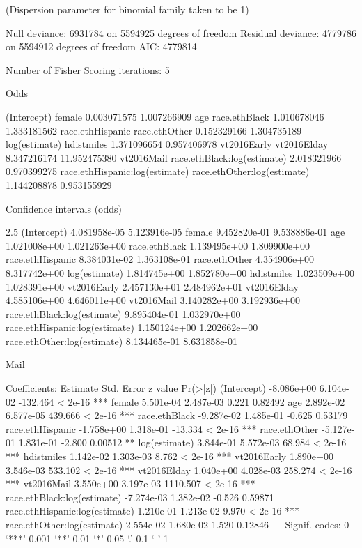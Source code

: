 (Dispersion parameter for binomial family taken to be 1)

    Null deviance: 6931784  on 5594925  degrees of freedom
Residual deviance: 4779786  on 5594912  degrees of freedom
AIC: 4779814

Number of Fisher Scoring iterations: 5

Odds

(Intercept)                         female
0.003071575                    1.007266909
        age                  race.ethBlack
1.010678046                    1.333181562
race.ethHispanic                  race.ethOther
0.152329166                    1.304735189
log(estimate)                     hdistmiles
1.371096654                    0.957406978
vt2016Early                    vt2016Elday
8.347216174                   11.952475380
 vt2016Mail    race.ethBlack:log(estimate)
2.018321966                    0.970399275
race.ethHispanic:log(estimate)    race.ethOther:log(estimate)
1.144208878                    0.953155929


Confidence intervals (odds)

2.5 %
(Intercept)                    4.081958e-05 5.123916e-05
female                         9.452820e-01 9.538886e-01
age                            1.021008e+00 1.021263e+00
race.ethBlack                  1.139495e+00 1.809900e+00
race.ethHispanic               8.384031e-02 1.363108e-01
race.ethOther                  4.354906e+00 8.317742e+00
log(estimate)                  1.814745e+00 1.852780e+00
hdistmiles                     1.023509e+00 1.028391e+00
vt2016Early                    2.457130e+01 2.484962e+01
vt2016Elday                    4.585106e+00 4.646011e+00
vt2016Mail                     3.140282e+00 3.192936e+00
race.ethBlack:log(estimate)    9.895404e-01 1.032970e+00
race.ethHispanic:log(estimate) 1.150124e+00 1.202662e+00
race.ethOther:log(estimate)    8.134465e-01 8.631858e-01



Mail

Coefficients:
                                 Estimate Std. Error  z value Pr(>|z|)
(Intercept)                    -8.086e+00  6.104e-02 -132.464  < 2e-16 ***
female                          5.501e-04  2.487e-03    0.221  0.82492
age                             2.892e-02  6.577e-05  439.666  < 2e-16 ***
race.ethBlack                  -9.287e-02  1.485e-01   -0.625  0.53179
race.ethHispanic               -1.758e+00  1.318e-01  -13.334  < 2e-16 ***
race.ethOther                  -5.127e-01  1.831e-01   -2.800  0.00512 **
log(estimate)                   3.844e-01  5.572e-03   68.984  < 2e-16 ***
hdistmiles                      1.142e-02  1.303e-03    8.762  < 2e-16 ***
vt2016Early                     1.890e+00  3.546e-03  533.102  < 2e-16 ***
vt2016Elday                     1.040e+00  4.028e-03  258.274  < 2e-16 ***
vt2016Mail                      3.550e+00  3.197e-03 1110.507  < 2e-16 ***
race.ethBlack:log(estimate)    -7.274e-03  1.382e-02   -0.526  0.59871
race.ethHispanic:log(estimate)  1.210e-01  1.213e-02    9.970  < 2e-16 ***
race.ethOther:log(estimate)     2.554e-02  1.680e-02    1.520  0.12846
---
Signif. codes:  0 ‘***’ 0.001 ‘**’ 0.01 ‘*’ 0.05 ‘.’ 0.1 ‘ ’ 1

